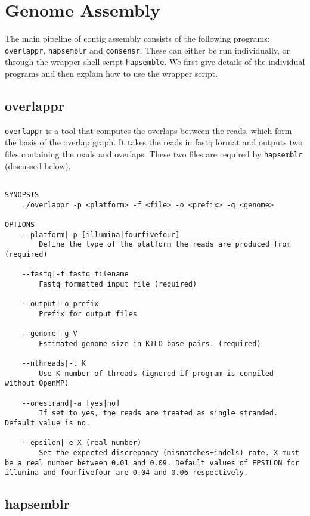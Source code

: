 \documentclass[12pt,a4paper]{report}
\begin{document}
\section{Genome Assembly}

The main pipeline of contig assembly consists of the following programs: \texttt{overlappr}, \texttt{hapsemblr} and \texttt{consensr}. These can either be run individually, or through the wrapper shell script \texttt{hapsemble}. We first give details of the individual programs and then explain how to use the wrapper script.

\subsection{overlappr}

\texttt{overlappr} is a tool that computes the overlaps between the reads, which form the basis of the overlap graph. It takes the reads in fastq format and outputs two files containing the reads and overlaps. These two files are required by \texttt{hapsemblr} (discussed below).

\begin{lstlisting}

SYNOPSIS
    ./overlappr -p <platform> -f <file> -o <prefix> -g <genome>

OPTIONS 
    --platform|-p [illumina|fourfivefour] 
        Define the type of the platform the reads are produced from (required) 

    --fastq|-f fastq_filename 
        Fastq formatted input file (required) 

    --output|-o prefix 
        Prefix for output files 

    --genome|-g V 
        Estimated genome size in KILO base pairs. (required) 

    --nthreads|-t K 
        Use K number of threads (ignored if program is compiled without OpenMP)

    --onestrand|-a [yes|no] 
        If set to yes, the reads are treated as single stranded. Default value is no. 

    --epsilon|-e X (real number) 
        Set the expected discrepancy (mismatches+indels) rate. X must be a real number between 0.01 and 0.09. Default values of EPSILON for illumina and fourfivefour are 0.04 and 0.06 respectively. 

\end{lstlisting}

\subsection{hapsemblr}
\end{document}
